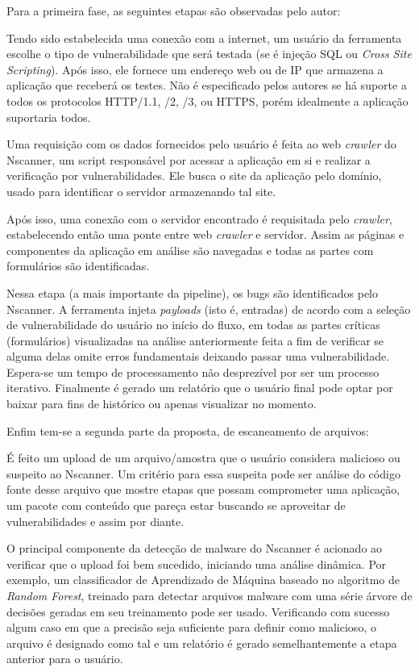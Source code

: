 Para a primeira fase, as seguintes etapas são observadas pelo autor:
\begin{alineas}
\item Tendo sido estabelecida uma conexão com a internet, um usuário da ferramenta escolhe o tipo de vulnerabilidade que será testada (se é injeção SQL ou \textit{Cross Site Scripting}). Após isso, ele fornece um endereço web ou de IP que armazena a aplicação que receberá os testes. Não é especificado pelos autores se há suporte a todos os protocolos HTTP/1.1, /2, /3, ou HTTPS, porém idealmente a aplicação suportaria todos.
\item Uma requisição com os dados fornecidos pelo usuário é feita ao web \textit{crawler} do Nscanner, um script responsável por acessar a aplicação em si e realizar a verificação por vulnerabilidades. Ele busca o site da aplicação pelo domínio, usado para identificar o servidor armazenando tal site.
\item Após isso, uma conexão com o servidor encontrado é requisitada pelo \textit{crawler}, estabelecendo então uma ponte entre web \textit{crawler} e servidor. Assim as páginas e componentes da aplicação em análise são navegadas e todas as partes com formulários são identificadas.
\item Nessa etapa (a mais importante da pipeline), os bugs são identificados pelo Nscanner. A ferramenta injeta \textit{payloads} (isto é, entradas) de acordo com a seleção de vulnerabilidade do usuário no início do fluxo, em todas as partes críticas (formulários) visualizadas na análise anteriormente feita a fim de verificar se alguma delas omite erros fundamentais deixando passar uma vulnerabilidade. Espera-se um tempo de processamento não desprezível por ser um processo iterativo. Finalmente é gerado um relatório que o usuário final pode optar por baixar para fins de histórico ou apenas visualizar no momento.
\end{alineas}

Enfim tem-se a segunda parte da proposta, de escaneamento de arquivos:
\begin{alineas}
\item É feito um upload de um arquivo/amostra que o usuário considera malicioso ou suspeito ao Nscanner. Um critério para essa suspeita pode ser análise do código fonte desse arquivo que mostre etapas que possam comprometer uma aplicação, um pacote com conteúdo que pareça estar buscando se aproveitar de vulnerabilidades e assim por diante. 
\item O principal componente da detecção de malware do Nscanner é acionado ao verificar que o upload foi bem sucedido, iniciando uma análise dinâmica. Por exemplo, um classificador de Aprendizado de Máquina baseado no algoritmo de \textit{Random Forest}, treinado para detectar arquivos malware com uma série árvore de decisões geradas em seu treinamento pode ser usado. Verificando com sucesso algum caso em que a precisão seja suficiente para definir como malicioso, o arquivo é designado como tal e um relatório é gerado semelhantemente a etapa anterior para o usuário.
\end{alineas}

